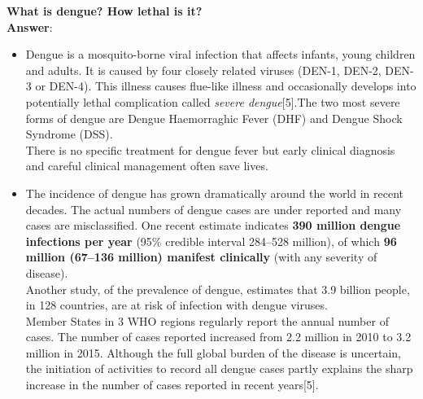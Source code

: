 \documentclass[11pt]{exam}
\begin{document}
\begin{questions}
\newpage
\question
\label{Q2.Lethal dengue} 
\textbf{What is dengue? How lethal is it?}\\
\textbf{Answer}:
\begin{itemize}
\item Dengue is a mosquito-borne viral infection that affects infants, young children and adults. It is caused by four closely related viruses (DEN-1, DEN-2, DEN-3 or DEN-4).
This illness causes flue-like illness and occasionally develops into potentially lethal complication called \textit{severe dengue}[5].The two most severe forms of dengue
are Dengue Haemorraghic Fever (DHF) and Dengue Shock Syndrome (DSS). \\ There is no specific treatment for dengue fever but early clinical diagnosis and careful clinical management often save lives. 
\item The incidence of dengue has grown dramatically around the world in recent decades. The actual numbers of dengue cases are under reported and many cases are misclassified. One recent estimate indicates \textbf{390 million dengue infections per year} (95\% credible interval 284–528 million), of which \textbf{96 million (67–136 million) manifest clinically} (with any severity of disease). \\ Another study, of the prevalence of dengue, estimates that 3.9 billion people, in 128 countries, are at risk of infection with dengue viruses. \\ 
Member States in 3 WHO regions regularly report the annual number of cases. The number of cases reported increased from 2.2 million in 2010 to 3.2 million in 2015. Although the full global burden of the disease is uncertain, the initiation of activities to record all dengue cases partly explains the sharp increase in the number of cases reported in recent years[5].\\ 


\end{itemize}
\end{questions}
\end{document}
